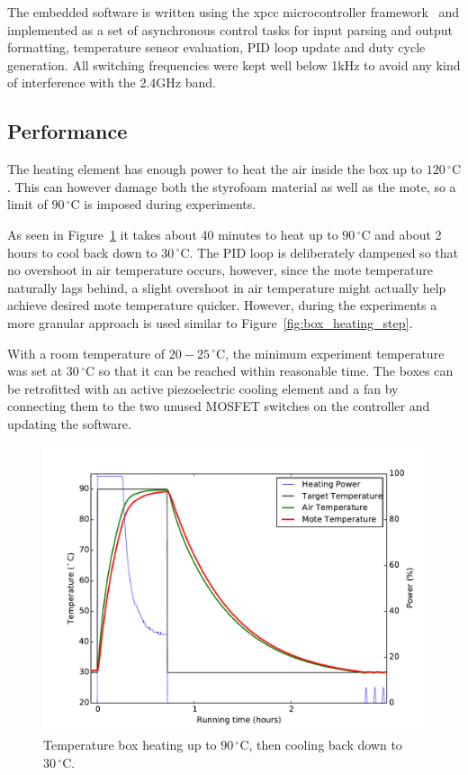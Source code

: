 The embedded software is written using the xpcc microcontroller framework~\cite{xpcc.io} and implemented as a set of asynchronous control tasks for input parsing and output formatting, temperature sensor evaluation, PID loop update and duty cycle generation.
All switching frequencies were kept well below 1kHz to avoid any kind of interference with the 2.4GHz band.

\subsection{Performance}

The heating element has enough power to heat the air inside the box up to $120\,^{\circ}\mathrm{C}$.
This can however damage both the styrofoam material as well as the mote, so a limit of $90\,^{\circ}\mathrm{C}$ is imposed during experiments.

As seen in Figure~\ref{fig:box_heating_cooling} it takes about 40 minutes to heat up to $90\,^{\circ}\mathrm{C}$ and about 2 hours to cool back down to $30\,^{\circ}\mathrm{C}$.
The PID loop is deliberately dampened so that no overshoot in air temperature occurs, however, since the mote temperature naturally lags behind, a slight overshoot in air temperature might actually help achieve desired mote temperature quicker.
However, during the experiments a more granular approach is used similar to Figure~\ref{fig:box_heating_step}.

With a room temperature of $20-25\,^{\circ}\mathrm{C}$, the minimum experiment temperature was set at $30\,^{\circ}\mathrm{C}$ so that it can be reached within reasonable time.
The boxes can be retrofitted with an active piezoelectric cooling element and a fan by connecting them to the two unused MOSFET switches on the controller and updating the software.

\begin{figure}[H]
	\centering
    \includegraphics[width=1\columnwidth]{figures/box_heating_cooling}
	\caption{Temperature box heating up to $90\,^{\circ}\mathrm{C}$, then cooling back down to $30\,^{\circ}\mathrm{C}$.}
    \label{fig:box_heating_cooling}
\end{figure}


